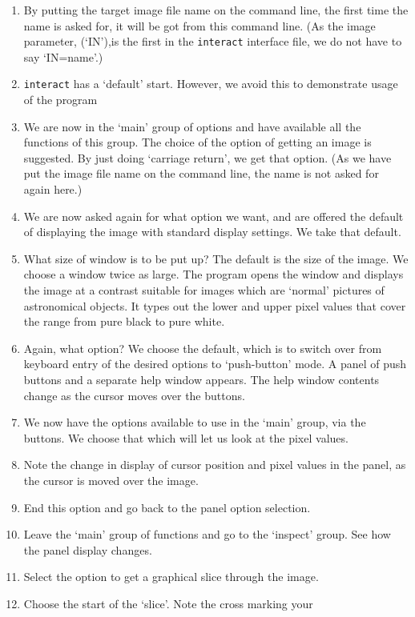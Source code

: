 \begin{small}
{{\begin{enumerate}
\item By putting the target image file name on the command line, the 
      first time the name is asked for, it will be got from this 
      command line. (As the image parameter, (`IN'),is the first in 
      the \verb|interact| interface file, we do not have to say `IN=name'.)
\item \verb|interact| has a `default' start. However, we avoid this to
      demonstrate usage of the program
\item We are now in the `main' group of options and have available all 
      the functions of this group. The choice of the option of 
      getting an image is suggested. By just doing `carriage return', 
      we get that option. (As we have put the image file name on the 
      command line, the name is not asked for again here.)
\item We are now asked again for what option we want, and are
      offered the default of displaying the image with standard display
      settings. We take that default.
\item What size of window is to be put up? The default is the size of 
      the image. We choose a window twice as large. The program opens
      the window and displays the image at a contrast suitable for
      images which are `normal' pictures of astronomical objects. It
      types out the lower and upper pixel values that cover the range
      from pure black to pure white.
\item Again, what option? We choose the default, which is
      to switch over from keyboard entry of the desired options to
      `push-button' mode. A panel of push buttons and a separate help 
      window appears. The help window contents change as the
      cursor moves over the buttons.
\item We now have the options available to use in the `main' group,
      via the buttons. We choose that which will let us look at the 
      pixel values.
\item Note the change in display of cursor position and pixel values 
      in the panel, as the cursor is moved over the image.
\item End this option and go back to the panel option selection.
\item Leave the `main' group of functions and go to the `inspect'
      group. See how the panel display changes.
\item Select the option to get a graphical slice through the image.
\item Choose the start of the `slice'. Note the cross marking your

\end{enumerate}}}
\end{small}
